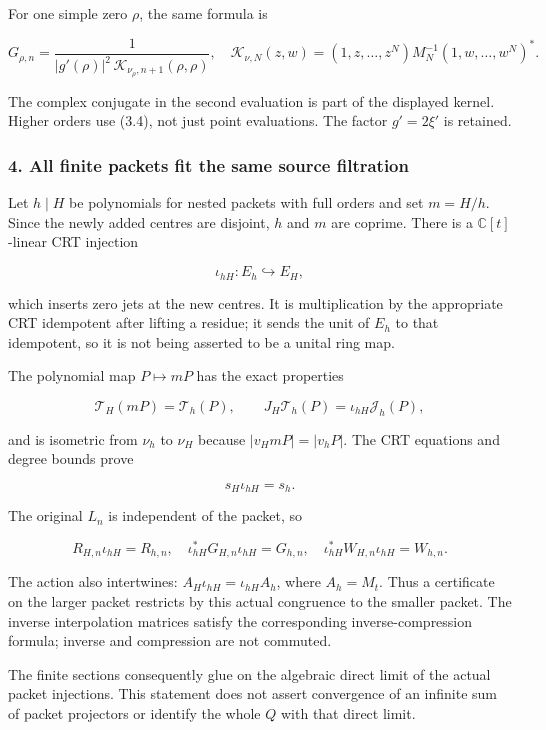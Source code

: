For one simple zero \(\rho\), the same formula is

\[G_{\rho,n}=\frac{1}{|g'(\rho)|^2\,\mathcal K_{\nu_\rho,n+1}(\rho,\rho)},\quad
\mathcal K_{\nu,N}(z,w)=(1,z,\ldots,z^N)M_N^{-1}(1,w,\ldots,w^N)^*.\tag{3.7}\]

The complex conjugate in the second evaluation is part of the displayed
kernel. Higher orders use (3.4), not just point evaluations. The factor
\(g'=2\xi'\) is retained.

\subsubsection{4. All finite packets fit the same source
filtration}\label{pr_14:all-finite-packets-fit-the-same-source-filtration}

Let \(h\mid H\) be polynomials for nested packets with full orders and
set \(m=H/h\). Since the newly added centres are disjoint, \(h\) and
\(m\) are coprime. There is a \(\mathbb C[t]\)-linear CRT injection

\[\iota_{hH}:E_h\hookrightarrow E_H,\]

which inserts zero jets at the new centres. It is multiplication by the
appropriate CRT idempotent after lifting a residue; it sends the unit of
\(E_h\) to that idempotent, so it is not being asserted to be a unital
ring map.

The polynomial map \(P\mapsto mP\) has the exact properties

\[\mathcal T_H(mP)=\mathcal T_h(P),\qquad
J_H\mathcal T_h(P)=\iota_{hH}\mathcal J_h(P),\tag{4.1}\]

and is isometric from \(\nu_h\) to \(\nu_H\) because \(|v_HmP|=|v_hP|\).
The CRT equations and degree bounds prove

\[s_H\iota_{hH}=s_h.\]

The original \(L_n\) is independent of the packet, so

\[\boxed{R_{H,n}\iota_{hH}=R_{h,n},\quad
\iota_{hH}^*G_{H,n}\iota_{hH}=G_{h,n},\quad
\iota_{hH}^*W_{H,n}\iota_{hH}=W_{h,n}.}\tag{4.2}\]

The action also intertwines: \(A_H\iota_{hH}=\iota_{hH}A_h\), where
\(A_h=M_t\). Thus a certificate on the larger packet restricts by this
actual congruence to the smaller packet. The inverse interpolation
matrices satisfy the corresponding inverse-compression formula; inverse
and compression are not commuted.

The finite sections consequently glue on the algebraic direct limit of
the actual packet injections. This statement does not assert convergence
of an infinite sum of packet projectors or identify the whole \(Q\) with
that direct limit.

